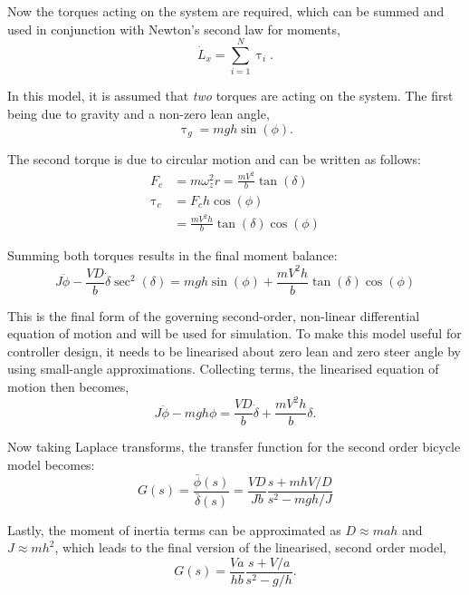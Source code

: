Now the torques acting on the system are required, which can be summed and used in conjunction with Newton's second law for moments,
\begin{equation*}
\dot{L}_x = \sum_{i=1}^N{\uptau_i}.
\end{equation*}

In this model, it is assumed that \textit{two} torques are acting on the system. The first being due to gravity and a non-zero lean angle,
\begin{equation*}
\uptau_{g} = m g h \sin{(\phi)}.
\end{equation*}

The second torque is due to circular motion and can be written as follows:
\begin{align*}
F_c &= m \omega^2_z r = \frac{m V^2}{b} \tan{(\delta)} \\
\uptau_c &= F_c h \cos{(\phi)} \\
&= \frac{m V^2 h}{b} \tan{(\delta)} \cos{(\phi)}
\end{align*}

Summing both torques results in the final moment balance:
\begin{equation}
J \ddot{\phi} - \frac{V D}{b} \dot{\delta} \sec^2{(\delta)} = m g h \sin{(\phi)} + \frac{m V^2 h}{b} \tan{(\delta)} \cos{(\phi)}
\label{eq:2ndOrderNL}
\end{equation}

This is the final form of the governing second-order, non-linear differential equation of motion and will be used for simulation. To make this model useful for controller design, it needs to be linearised about zero lean and zero steer angle by using small-angle approximations. Collecting terms, the linearised equation of motion then becomes,
\begin{equation*}
J \ddot{\phi} - m g h \phi = \frac{V D}{b} \dot{\delta} + \frac{m V^2 h}{b} \delta.
\end{equation*}

Now taking Laplace transforms, the transfer function for the second order bicycle model becomes:
\begin{equation*}
G(s) = \frac{\bar{\phi}(s)}{\bar{\delta}(s)} =  \frac{V D}{J b} \frac{s + m h V / D}{s^2 - m g h / J}
\end{equation*}

Lastly, the moment of inertia terms can be approximated as $D \approx m a h$ and $J \approx m h^2$, which leads to the final version of the linearised, second order model,
\begin{equation}
G(s) = \frac{V a}{h b} \frac{s + V/a}{s^2 - g/h}.
\label{eq:2ndOrder}
\end{equation}

